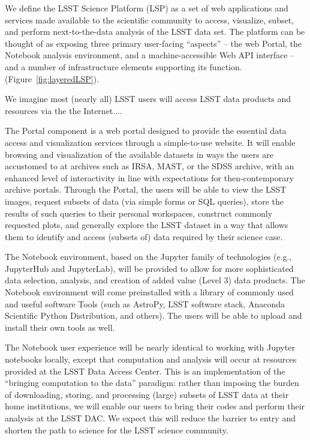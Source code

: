 \documentclass[DM,lsstdraft,toc]{lsstdoc}
\begin{document}
We define the LSST Science Platform (LSP) as a set of web applications and
services made available to the scientific community to access, visualize,
subset, and perform next-to-the-data analysis of the LSST data set.  The
platform can be thought of as exposing three primary user-facing ``aspects''
-- the web Portal, the Notebook analysis environment, and a
machine-accessible Web API interface -- and a number of infrastructure
elements supporting its function.  (Figure~\ref{fig:layeredLSP}).

We imagine most (nearly all) LSST users will access LSST data products and
resources via the the Internet....

The Portal component is a web portal designed to provide the essential data
access and visualization services through a simple-to-use website.  It will
enable browsing and visualization of the available datasets in ways the
users are accustomed to at archives such as IRSA, MAST, or the SDSS archive,
with an enhanced level of interactivity in line with expectations for
then-contemporary archive portals.  Through the Portal, the users will be
able to view the LSST images, request subsets of data (via simple forms or
SQL queries), store the results of such queries to their personal
workspaces, construct commonly requested plots, and generally explore the
LSST dataset in a way that allows them to identify and access (subsets of)
data required by their science case.

The Notebook environment, based on the Jupyter family of technologies (e.g.,
JupyterHub and JupyterLab), will be provided to allow for more sophisticated
data selection, analysis, and creation of added value (Level 3) data
products.  The Notebook environment will come preinstalled with a library of
commonly used and useful software Tools (such as AstroPy, LSST software
stack, Anaconda Scientific Python Distribution, and others).  The users will
be able to upload and install their own tools as well.

The Notebook user experience will be nearly identical to working with
Jupyter notebooks locally, except that computation and analysis will occur
at resources provided at the LSST Data Access Center.  This is an
implementation of the “bringing computation to the data” paradigm: rather
than imposing the burden of downloading, storing, and processing (large)
subsets of LSST data at their home institutions, we will enable our users to
bring their codes and perform their analysis at the LSST DAC.  We expect
this will reduce the barrier to entry and shorten the path to science for
the LSST science community.
\end{document}
